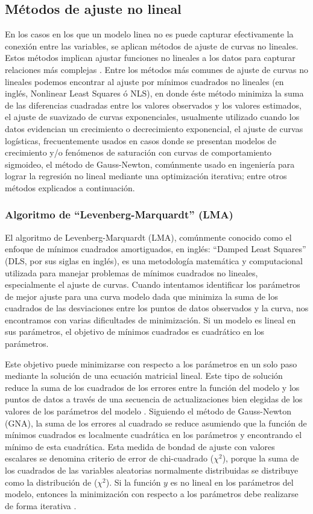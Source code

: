 \subsection{Métodos de ajuste no lineal}
En los casos en los que un modelo linea no es puede capturar efectivamente la conexión entre las variables, se aplican métodos de ajuste de curvas no lineales. Estos métodos implican ajustar funciones no lineales a los datos para capturar relaciones más complejas \cite{curvefitdalgaard}. Entre los métodos más comunes de ajuste de curvas no lineales podemos encontrar al ajuste por mínimos cuadrados no lineales (en inglés, Nonlinear Least Squares ó NLS), en donde éste método minimiza la suma de las diferencias cuadradas entre los valores observados y los valores estimados, el ajuste de suavizado de curvas exponenciales, usualmente utilizado cuando los datos evidencian un crecimiento o decrecimiento exponencial, el ajuste de curvas logísticas, frecuentemente usados en casos donde se presentan modelos de crecimiento y/o fenómenos de saturación con curvas de comportamiento sigmoideo, el método de Gauss-Newton, comúnmente usado en ingeniería para lograr la regresión no lineal mediante una optimización iterativa; entre otros métodos explicados a continuación.


\subsubsection{Algoritmo de ``Levenberg-Marquardt'' (LMA)}\label{LMAlabel}

El algoritmo de Levenberg-Marquardt (LMA), comúnmente conocido como el enfoque de mínimos cuadrados amortiguados, en inglés: ``Damped Least Squares'' (DLS, por sus siglas en inglés), es una metodología matemática y computacional utilizada para manejar problemas de mínimos cuadrados no lineales, especialmente el ajuste de curvas. Cuando intentamos identificar los parámetros de mejor ajuste para una curva modelo dada que minimiza la suma de los cuadrados de las desviaciones entre los puntos de datos observados y la curva, nos encontramos con varias dificultades de minimización. Si un modelo es lineal en sus parámetros, el objetivo de mínimos cuadrados es cuadrático en los parámetros.

Este objetivo puede minimizarse con respecto a los parámetros en un solo paso mediante la solución de una ecuación matricial lineal. Este tipo de solución reduce la suma de los cuadrados de los errores entre la función del modelo y los puntos de datos a través de una secuencia de actualizaciones bien elegidas de los valores de los parámetros del modelo \cite{levenberduke}. Siguiendo el método de Gauss-Newton (GNA), la suma de los errores al cuadrado se reduce asumiendo que la función de mínimos cuadrados es localmente cuadrática en los parámetros y encontrando el mínimo de esta cuadrática. Esta medida de bondad de ajuste con valores escalares se denomina criterio de error de chi-cuadrado ($\chi^{2}$), porque la suma de los cuadrados de las variables aleatorias normalmente distribuidas se distribuye como la distribución de ($\chi^{2}$). Si la función $y$ es no lineal en los parámetros del modelo, entonces la minimización con respecto a los parámetros debe realizarse de forma iterativa \cite{levenberduke}.


